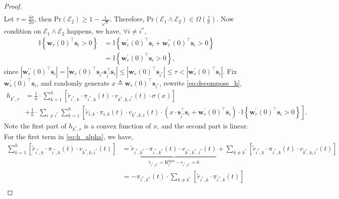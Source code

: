 \documentclass[10pt]{article}
\def\rvs{{\mathbf{s}}}
\def\rvw{{\mathbf{w}}}
\def\pr{{\text{Pr}}}
\def\r{{\text{R}}}
\def\sI{{\mathbb{I}}}
\def\gE{{\mathcal{E}}}
\begin{document}
\begin{proof}
\begin{equation*}
\begin{split}
\end{split}
\end{equation*}
Let $\tau = \frac{\delta\sigma}{2n}$, then $\pr\left(\gE_2\right) \ge 1 - \frac{1}{\sqrt{\pi}}$. Therefore, $\pr\left( \gE_1 \land \gE_2 \right) \in \Omega\left( \frac{\tau}{\sigma} \right)$. Now condition on $\gE_1 \land \gE_2$ happens, we have, $\forall i \not= i^*$,
\begin{equation*}
\begin{split}
	\sI\left\{ \rvw_r(0)^\top \rvs_i > 0 \right\} &= \sI\left\{ \rvw_r^\prime(0)^\top \rvs_i + \rvw_r^{\prime\prime}(0)^\top \rvs_{i} > 0 \right\} \\
	&= \sI\left\{ \rvw_r^\prime(0)^\top \rvs_i > 0 \right\},
\end{split}
\end{equation*}
since $\left| \rvw_r^{\prime\prime}(0)^\top \rvs_{i} \right| = \left| \rvw_r(0)^\top \rvs_{i^*} \rvs_{i^*}^\top \rvs_{i} \right| \le \left| \rvw_r(0)^\top \rvs_{i^*} \right| \le \tau < \left| \rvw_r^\prime(0)^\top \rvs_i  \right|$. Fix $\rvw_r^\prime(0)^\top \rvs_i$, and randomly generate $x \triangleq \rvw_r(0)^\top \rvs_{i^*}$, rewrite \cref{eq:decompose_h},
\begin{equation}
\label{eq:h_alpha}
\begin{split}
	h_{k^*,r} &= \frac{1}{n} \cdot \sum\limits_{k=1}^{h}{ \left[ \tilde{r}_{i^*,k} \cdot \pi_{i^*,k}(t) \cdot v_{k^*,k,i^*}(t) \cdot \sigma(x) \right] } \\
	&+ \frac{1}{n} \cdot \sum\limits_{i \not= i^*}{\sum\limits_{k=1}^{h}{ \left[ \tilde{r}_{i,k} \cdot \pi_{i,k}(t) \cdot v_{k^*,k,i}(t) \cdot ( x \cdot \rvs_{i^*}^\top \rvs_{i} + \rvw_r^\prime(0)^\top \rvs_i ) \cdot \sI\left\{ \rvw_r^\prime(0)^\top \rvs_i > 0 \right\}  \right] } }.
\end{split}
\end{equation}
Note the first part of $h_{k^*,r}$ is a convex function of $x$, and the second part is linear. For the first term in \cref{eq:h_alpha}, we have,
\begin{equation*}
\begin{split}
	\sum\limits_{k=1}^{h}{ \left[ \tilde{r}_{i^*,k} \cdot \pi_{i^*,k}(t) \cdot v_{k^*,k,i^*}(t) \right] } &= \underbrace{\tilde{r}_{i^*,k^*} \cdot \pi_{i^*,k^*}(t) \cdot v_{k^*,k^*,i^*}(t)}_{\tilde{r}_{i^*,k^*} = \r_{i^*}^{\max} -  r_{i^*,k^*} = 0} + \sum\limits_{k\not=k^*}{ \left[ \tilde{r}_{i^*,k} \cdot \pi_{i^*,k}(t) \cdot v_{k^*,k,i^*}(t) \right] } \\
	&= - \pi_{i^*,k^*}(t) \cdot \sum\limits_{k\not=k^*}{ \left[ \tilde{r}_{i^*,k} \cdot \pi_{i^*,k}(t) \right] } \\

\end{split}
\end{equation*}
\end{proof}
\end{document}
